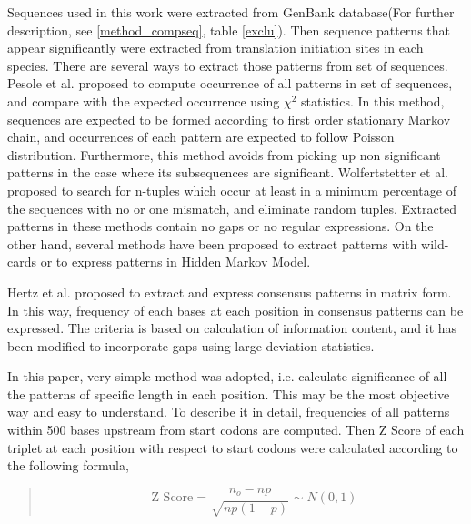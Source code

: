 Sequences used in this work were extracted from GenBank database(For
further description, see \ref{method_compseq}, table \ref{exclu}).
Then sequence patterns that
appear significantly were extracted from translation initiation sites
in each species. There are several ways to extract those patterns from
set of sequences. Pesole et al.\cite{label601} proposed to compute
occurrence of all patterns in set of sequences, and compare with the
expected occurrence using
\(\chi^{2}\) statistics. In this method, sequences are expected to be
formed according to first order stationary Markov chain, and
occurrences of each pattern are expected to follow Poisson
distribution. Furthermore, this method avoids from picking up non
significant patterns in the case where its subsequences are
significant. Wolfertstetter et al.\cite{label603} proposed to search
for n-tuples which occur at least in a minimum percentage of the
sequences with no or one mismatch, and eliminate random tuples.
Extracted patterns in these methods contain no gaps or no regular
expressions. On the other hand, several methods have been proposed to extract
patterns with wild-cards\cite{label615,label605} or to express
patterns in Hidden Markov Model\cite{label515}.

Hertz et al.\cite{label625} proposed to extract and express consensus
patterns in matrix form. In this way, frequency of each bases at each
position in consensus patterns can be expressed. The criteria is based
on calculation of information content, and it has been modified to
incorporate gaps using large deviation
statistics\cite{label635,label629}.

In this paper, very simple method was adopted, i.e. calculate
significance of all the patterns of specific length in each
position. This may be the most objective way and easy to understand.
To describe it in detail, frequencies of all patterns within 500 bases
upstream from start codons are computed. Then Z Score of each triplet
at each position with respect to start codons were calculated
according to the following formula,

\begin{quotation}
\begin{center}
\[
\mbox{Z Score} = \frac{n_{o} - np}{\sqrt{np(1-p)}} \sim N(0,1)
\]
\end{center}
\end{quotation}

